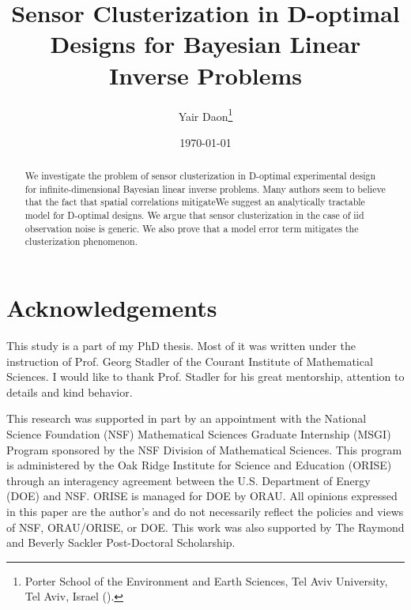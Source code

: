 \documentclass{siamonline220329}
\title{Sensor Clusterization in D-optimal Designs for Bayesian Linear
  Inverse Problems}
\author{Yair Daon\thanks{Porter School of the Environment and Earth
    Sciences, Tel Aviv University, Tel Aviv, Israel
    (\email{yair.daon@gmail.com}).}}
\date{\today}
\begin{document}
\maketitle
\begin{abstract}
  We investigate the problem of sensor clusterization in D-optimal
  experimental design for infinite-dimensional Bayesian linear inverse
  problems. Many authors seem to believe that the fact that spatial
  correlations mitigateWe suggest an analytically tractable model for D-optimal
  designs. We argue that sensor clusterization in the case of iid
  observation noise is generic. We also prove that a model error term
  mitigates the clusterization phenomenon.

\end{abstract}

\maketitle










\section{Acknowledgements}
This study is a part of my PhD thesis. Most of it was written under
the instruction of Prof. Georg Stadler of the Courant Institute of
Mathematical Sciences. I would like to thank Prof. Stadler for his
great mentorship, attention to details and kind behavior.

This research was supported in part by an appointment with the
National Science Foundation (NSF) Mathematical Sciences Graduate
Internship (MSGI) Program sponsored by the NSF Division of
Mathematical Sciences. This program is administered by the Oak Ridge
Institute for Science and Education (ORISE) through an interagency
agreement between the U.S. Department of Energy (DOE) and NSF. ORISE
is managed for DOE by ORAU. All opinions expressed in this paper are
the author's and do not necessarily reflect the policies and views of
NSF, ORAU/ORISE, or DOE.  This work was also supported by The Raymond
and Beverly Sackler Post-Doctoral Scholarship.





\end{document}
